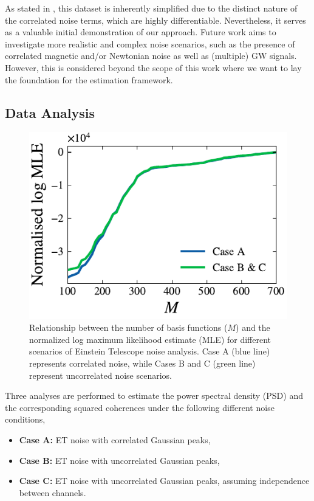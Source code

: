 \documentclass[%
 reprint,
 amsmath,amssymb,
 aps,
 nofootinbib,
]{revtex4-2}
\begin{document}
As stated in \citet{Janssens2023}, this dataset is inherently simplified due to the distinct nature of the correlated noise terms, which are highly differentiable.
Nevertheless, it serves as a valuable initial demonstration of our approach.
Future work aims to investigate more realistic and complex noise scenarios, such as the presence of correlated magnetic \citet{Janssens_magnetic_noise,Ball_lightning_strokes} and/or Newtonian noise \cite{Janssens_newtonian_seismic,PhysRevD.109.102002} as well as (multiple) GW signals. However, this is considered beyond the scope of this work where we want to lay the foundation for the estimation framework.

\subsection{Data Analysis}


\begin{figure}[!t]
\centering
  \includegraphics[width=\columnwidth]{et_basis_fns.pdf}
  \caption{Relationship between the number of basis functions ($M$) and the normalized log maximum likelihood estimate (MLE) for different scenarios of Einstein Telescope noise analysis. Case A (blue line) represents correlated noise, while Cases B and C (green line) represent uncorrelated noise scenarios.
  }
  \label{et_corr_basis_funs_vs_mle}
\end{figure}


Three analyses are performed to estimate the power spectral density (PSD) and the corresponding squared coherences under the following different noise conditions,
\begin{itemize}
\setlength{\itemindent}{-15pt}
    \item[] \textbf{Case A:}  ET noise with correlated Gaussian peaks,
    \item[] \textbf{Case B:} ET noise with uncorrelated Gaussian peaks,
    \item[] \textbf{Case C:} ET noise with uncorrelated Gaussian peaks, assuming independence between channels.
\end{itemize}
\end{document}
